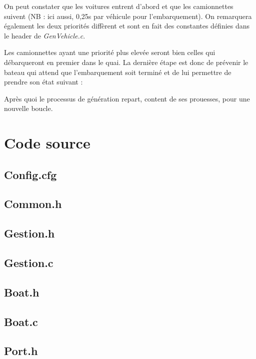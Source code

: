 \documentclass[a4paper, 11pt]{article}
\begin{document}
		
		On peut constater que les voitures entrent d'abord et que les camionnettes suivent (NB : ici aussi, 0,25s par véhicule pour l'embarquement). On remarquera également les deux priorités diffèrent et sont en fait des constantes définies dans le header de \textit{GenVehicle.c}.
		
		Les camionnettes ayant une priorité plus elevée seront bien celles qui débarqueront en premier dans le quai. La dernière étape est donc de prévenir le bateau qui attend que l'embarquement soit terminé et de lui permettre de prendre son état suivant :
		
		Après quoi le processus de génération repart, content de ses prouesses, pour une nouvelle boucle.

\section{Code source}
	\subsection{Config.cfg}
		
	\subsection{Common.h}
		
	\subsection{Gestion.h}
		
	\subsection{Gestion.c}
		
	\subsection{Boat.h}
		
	\subsection{Boat.c}
		
	\subsection{Port.h}
		
\end{document}
